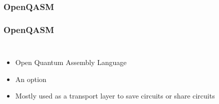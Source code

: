 \documentclass[aspectratio=169,11pt,hyperref={colorlinks=true}]{beamer}
\begin{document}
\begin{frame}
    
\end{frame}

\subsubsection{OpenQASM}
\begin{frame}
    \frametitle{OpenQASM\footnotemark[1]\footnotemark[2]}
    \begin{columns}
            
            \begin{itemize}
                \item Open Quantum Assembly Language
                \item An option
                \item Mostly used as a transport layer to save circuits
                    or share circuits
            \end{itemize}
    \end{columns}
\end{frame}
\end{document}
